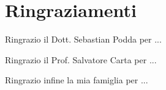 \documentclass[12pt,a4paper,italian,twoside, openany]{book}
\begin{document}


\setlength{\parskip}{\bigskipamount}
\renewcommand{\baselinestretch}{1.4}\normalsize


\renewcommand{\baselinestretch}{1}\normalsize


\frontmatter 						%
\tableofcontents

\pagestyle{plain}

\renewcommand{\baselinestretch}{1.4}\normalsize

\mainmatter







\pagestyle{empty}

\chapter*{Ringraziamenti}
Ringrazio il Dott. Sebastian Podda per ...

Ringrazio il Prof. Salvatore Carta per ...

Ringrazio infine la mia famiglia per ...


%




\nocite{*}



\cleardoublepage
\listoffigures
\listoftables

\cleardoublepage
\end{document}
